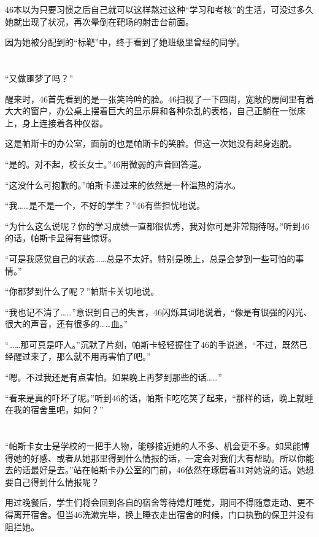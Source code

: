 46本以为只要习惯之后自己就可以这样熬过这种“学习和考核”的生活，可没过多久她就出现了状况，再次晕倒在靶场的射击台前面。

因为她被分配到的“标靶”中，终于看到了她班级里曾经的同学。

\section*{}

“又做噩梦了吗？”

醒来时，46首先看到的是一张笑吟吟的脸。46扫视了一下四周，宽敞的房间里有着大大的窗户，办公桌上摆着巨大的显示屏和各种杂乱的表格，自己正躺在一张床上，身上连接着各种仪器。

这是帕斯卡的办公室，面前的也是帕斯卡的笑脸。但这一次她没有起身逃脱。

“是的。对不起，校长女士。”46用微弱的声音回答道。

“这没什么可抱歉的。”帕斯卡递过来的依然是一杯温热的清水。

“我……是不是一个，不好的学生？”46有些担忧地说。

“为什么这么说呢？你的学习成绩一直都很优秀，我对你可是非常期待呀。”听到46的话，帕斯卡显得有些惊讶。

“可是我感觉自己的状态……总是不太好。特别是晚上，总是会梦到一些可怕的事情。”

“你都梦到什么了呢？”帕斯卡关切地说。

“我也记不清了……”意识到自己的失言，46闪烁其词地说着，“像是有很强的闪光、很大的声音，还有很多的……血。”

“……那可真是吓人。”沉默了片刻，帕斯卡轻轻握住了46的手说道，“不过，既然已经醒过来了，那么就不用再害怕了吧。”

“嗯。不过我还是有点害怕。如果晚上再梦到那些的话……”

“看来是真的吓坏了呢。”听到46的话，帕斯卡吃吃笑了起来，“那样的话，晚上就睡在我的宿舍里吧，如何？”

\section*{}

“帕斯卡女士是学校的一把手人物，能够接近她的人不多、机会更不多。如果能博得她的好感、或者从她那里得到什么情报的话，一定会对我们大有帮助。所以你能去的话最好是去。”站在帕斯卡办公室的门前，46依然在琢磨着31对她说的话。她想要自己得到什么情报呢？

用过晚餐后，学生们将会回到各自的宿舍等待熄灯睡觉，期间不得随意走动、更不得离开宿舍。但当46洗漱完毕，换上睡衣走出宿舍的时候，门口执勤的保卫并没有阻拦她。


